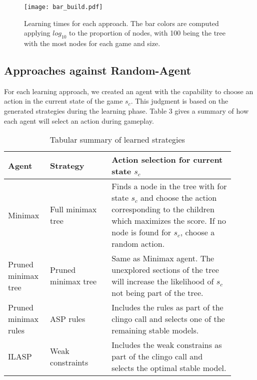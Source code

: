 \begin{figure}[H]
    \centering
    \texttt{[image: bar\_build.pdf]}
    \caption{Learning times for each approach. The bar colors are computed applying $log_{10}$ to the proportion of nodes, with 100 being the tree with the most nodes for each game and size.}
\end{figure}

\subsection{Approaches against Random-Agent}

For each learning approach, we created an agent with the capability to choose an action in the current state of the game $s_c$. This judgment is based on the generated strategies during the learning phase. Table 3 gives a summary of how each agent will select an action during gameplay. 

\begin{table}[H]
	\centering
	\small
	\setlength{\tabcolsep}{0.5em}
	\def\arraystretch{1.1}
	\begin{threeparttable}
		\begin{tabular}{L{0.15\linewidth} p{0.25\linewidth} p{0.5\linewidth}}
			\toprule[0.25mm]
            Agent & Strategy & Action selection for current state $s_c$ 
            \\
			\midrule[0.35mm]
            Minimax  & Full minimax tree 
            &Finds a node in the tree with for state $s_c$ and choose the action corresponding to the children which maximizes the score. If no node is found for $s_c$, choose a random action.
            \\[20pt]
            Pruned minimax tree   & Pruned minimax tree 
            & Same as Minimax agent. The unexplored sections of the tree will increase the likelihood of $s_c$ not being part of the tree.
            \\[20pt]
            Pruned minimax rules & ASP rules   
            & Includes the rules as part of the clingo call and selects one of the remaining stable models. 
            \\[20pt]
            ILASP & Weak constraints  
            & Includes the weak constrains as part of the clingo call and selects the optimal stable model.
            \\
			\bottomrule[0.25mm]
		\end{tabular}
		\caption{Tabular summary of learned strategies}
	\end{threeparttable}
\end{table}

